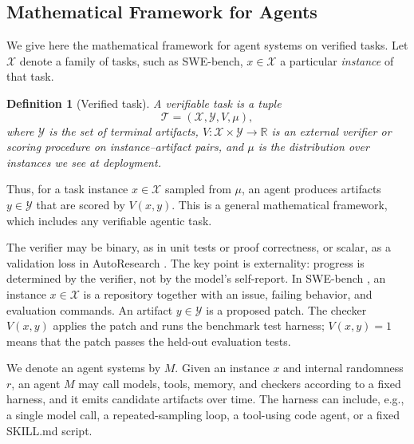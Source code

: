 \documentclass{article}
\newtheorem{definition}{Definition}
\newcommand{\cX}{\mathcal{X}}
\newcommand{\cY}{\mathcal{Y}}
\begin{document}
\subsection{Mathematical Framework for Agents}
We give here the mathematical framework for agent systems on verified tasks. Let \(\mathcal X\) denote a family of tasks, such as
SWE-bench, \(x\in\mathcal X\) a particular \textit{instance} of that task.

\begin{definition}[Verified task]
\label{def:verified-task}
A verifiable task is a tuple
\[
\mathcal T=(\mathcal X,\mathcal Y,V,\mu),
\]
where $\mathcal Y$ is the set of terminal artifacts,
$V: \mathcal{X} \times \mathcal{Y} \to \mathbb R$ is an external verifier or scoring procedure on instance--artifact pairs, and
$\mu$ is the distribution over instances we see at deployment.
\end{definition}
Thus, for a task instance $x\in\mathcal X$ sampled from $\mu$, an agent produces artifacts $y\in\mathcal Y$ that are scored by $V(x,y)$. This is a general mathematical framework, which includes any verifiable agentic task.

The verifier may be binary, as in unit tests or proof correctness, or scalar, as a validation loss in AutoResearch \citep{karpathy2026autoresearch}.
The key point is externality: progress is determined by the verifier, not by the model's self-report.
In SWE-bench \citet{jimenez2024swebench}, an instance \(x\in\cX\) is a repository together with an issue, failing behavior, and evaluation commands.
An artifact \(y\in\cY\) is a proposed patch.
The checker \(V(x,y)\) applies the patch and runs the benchmark test harness; \(V(x,y)=1\) means that the patch passes the held-out evaluation tests.

We denote an agent systems by $M$.
Given an instance \(x\) and internal randomness \(r\), an agent $M$ may call models, tools, memory, and checkers according to a fixed harness, and it emits candidate artifacts over time. The harness can include, e.g., a single model call, a repeated-sampling loop, a tool-using code agent, or a fixed SKILL.md script.
\end{document}
